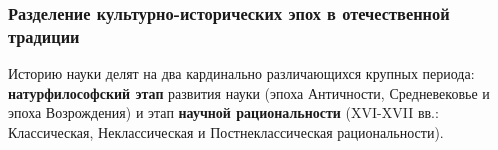 


\subsubsection{Разделение культурно-исторических эпох в отечественной традиции}

Историю науки делят на два кардинально различающихся крупных периода: \textbf{натурфилософский этап} развития науки (эпоха Античности, Средневековье и эпоха Возрождения) и этап \textbf{научной рациональности} (XVI-XVII вв.: Классическая, Неклассическая и Постнеклассическая рациональности).


